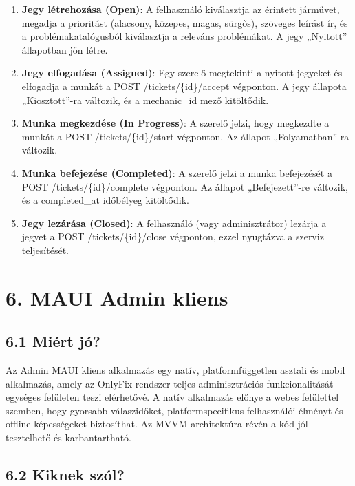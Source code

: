 \begin{enumerate}
\def\labelenumi{\arabic{enumi}.}
\item
  \textbf{Jegy létrehozása (Open)}: A felhasználó kiválasztja az érintett járművet, megadja a prioritást (alacsony, közepes, magas, sürgős), szöveges leírást ír, és a problémakatalógusból kiválasztja a releváns problémákat. A jegy „Nyitott'' állapotban jön létre.
\item
  \textbf{Jegy elfogadása (Assigned)}: Egy szerelő megtekinti a nyitott jegyeket és elfogadja a munkát a POST /tickets/\{id\}/accept végponton. A jegy állapota „Kiosztott''-ra változik, és a mechanic\_id mező kitöltődik.
\item
  \textbf{Munka megkezdése (In Progress)}: A szerelő jelzi, hogy megkezdte a munkát a POST /tickets/\{id\}/start végponton. Az állapot „Folyamatban''-ra változik.
\item
  \textbf{Munka befejezése (Completed)}: A szerelő jelzi a munka befejezését a POST /tickets/\{id\}/complete végponton. Az állapot „Befejezett''-re változik, és a completed\_at időbélyeg kitöltődik.
\item
  \textbf{Jegy lezárása (Closed)}: A felhasználó (vagy adminisztrátor) lezárja a jegyet a POST /tickets/\{id\}/close végponton, ezzel nyugtázva a szerviz teljesítését.
\end{enumerate}

\protect{}\label{_Toc223012187}{}

\chapter{6. MAUI Admin kliens}\label{maui-admin-kliens}

\section{6.1 Miért jó?}\label{miuxe9rt-juxf3}

Az Admin MAUI kliens alkalmazás egy natív, platformfüggetlen asztali és mobil alkalmazás, amely az OnlyFix rendszer teljes adminisztrációs funkcionalitását egységes felületen teszi elérhetővé. A natív alkalmazás előnye a webes felülettel szemben, hogy gyorsabb válaszidőket, platformspecifikus felhasználói élményt és offline-képességeket biztosíthat. Az MVVM architektúra révén a kód jól tesztelhető és karbantartható.

\section{6.2 Kiknek szól?}\label{kiknek-szuxf3l}

